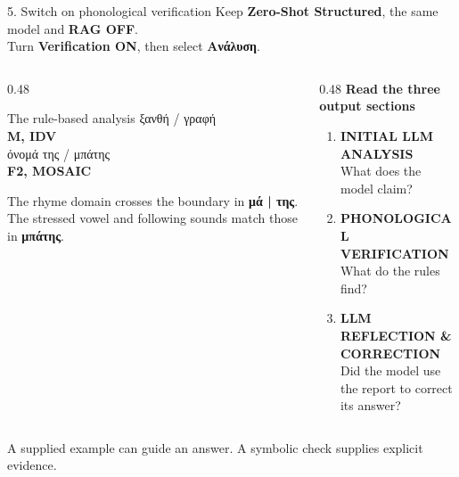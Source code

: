 \documentclass[aspectratio=169,10pt]{beamer}
\newcommand{\key}[1]{\textcolor{aegean}{\textbf{#1}}}
\begin{document}
\begin{frame}{5. Switch on phonological verification}
  \small Keep \textbf{Zero-Shot Structured}, the same model and \textbf{RAG OFF}.\\
  Turn \key{Verification ON}, then select \textbf{Ανάλυση}.
  \vspace{0.8em}
  \begin{columns}[T]
    \begin{column}{0.48\textwidth}
      \begin{block}{The rule-based analysis}
        \small ξανθή / γραφή\\[3pt]
        \key{M, IDV}\\[9pt]
        όνομά της / μπάτης\\[3pt]
        \key{F2, MOSAIC}
      \end{block}
      \footnotesize The rhyme domain crosses the boundary in \textbf{μά | της}. The stressed vowel and following sounds match those in \textbf{μπάτης}.
    \end{column}
    \begin{column}{0.48\textwidth}
      \textbf{Read the three output sections}
      \begin{enumerate}
        \item \textbf{INITIAL LLM ANALYSIS}\\What does the model claim?
        \item \textbf{PHONOLOGICAL VERIFICATION}\\What do the rules find?
        \item \textbf{LLM REFLECTION \& CORRECTION}\\Did the model use the report to correct its answer?
      \end{enumerate}
    \end{column}
  \end{columns}
  \vfill
  \small A supplied example can guide an answer. A symbolic check supplies explicit evidence.
\end{frame}
\end{document}
